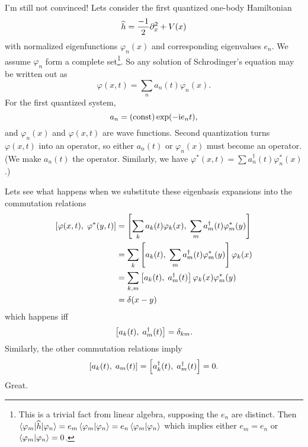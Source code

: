  I'm still not convinced! Lets consider the first
quantized one-body Hamiltonian
\begin{equation}
\widehat{h} = \frac{-1}{2}\partial_{x}^{2} + V(x)
\end{equation}
with normalized eigenfunctions $\varphi_{n}(x)$ and corresponding
eigenvalues $e_{n}$. We assume $\varphi_{n}$ form a complete
set\footnote{This is a trivial fact from linear algebra, supposing the
  $e_{n}$ are distinct. Then
  $\braket{\varphi_{m}|\widehat{h}|\varphi_{n}}=e_{m}\braket{\varphi_{m}|\varphi_{n}}=e_{n}\braket{\varphi_{m}|\varphi_{n}}$
  which implies either $e_{m}=e_{n}$ or
  $\braket{\varphi_{m}|\varphi_{n}}=0$.}. So any solution of
Schrodinger's equation may be written out as
\begin{equation}
\varphi(x,t) = \sum_{n}a_{n}(t)\varphi_{n}(x).
\end{equation}
For the first quantized system, 
\begin{equation}
a_{n}=(\mbox{const})\exp(-{\rm i} e_{n}t),
\end{equation}
and $\varphi_{n}(x)$ and $\varphi(x,t)$ are wave functions. Second
quantization turns $\varphi(x,t)$ into an operator, so either $a_{n}(t)$
or $\varphi_{n}(x)$ must become an operator. (We make $a_{n}(t)$ the
operator. Similarly, we have $\varphi^{*}(x,t)=\sum
a^{\dagger}_{n}(t)\varphi^{*}_{n}(x)$.)

Lets see what happens when we substitute these eigenbasis expansions
into the commutation relations
\begin{subequations}
\begin{align}
\left\lbrack\varphi(x,t),\;\varphi^{*}(y,t)\right\rbrack
&=\left\lbrack\sum_{k}a_{k}(t)\varphi_{k}(x),\;\sum_{m}a^{\dagger}_{m}(t)\varphi^{*}_{m}(y)\right\rbrack\\
&=\sum_{k}\left\lbrack a_{k}(t),\;\sum_{m}a^{\dagger}_{m}(t)\varphi^{*}_{m}(y)\right\rbrack\varphi_{k}(x)\\
&=\sum_{k,m}\left\lbrack a_{k}(t),\;a^{\dagger}_{m}(t)\right\rbrack\varphi_{k}(x)\varphi^{*}_{m}(y)\\
&=\delta(x-y)
\end{align}
\end{subequations}
which happens iff
\begin{equation}
\left\lbrack a_{k}(t),\;a^{\dagger}_{m}(t)\right\rbrack=\delta_{km}.
\end{equation}
Similarly, the other commutation relations imply
\begin{equation}
\left\lbrack a_{k}(t),\;a_{m}(t)\right\rbrack=\left\lbrack a^{\dagger}_{k}(t),\;a^{\dagger}_{m}(t)\right\rbrack=0.
\end{equation}
Great.

